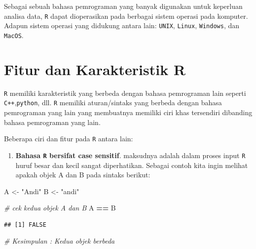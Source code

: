 \documentclass[
]{book}
\newenvironment{Shaded}{\begin{snugshade}}{\end{snugshade}}
\newcommand{\CommentTok}[1]{\textcolor[rgb]{0.56,0.35,0.01}{\textit{#1}}}
\newcommand{\NormalTok}[1]{#1}
\newcommand{\OtherTok}[1]{\textcolor[rgb]{0.56,0.35,0.01}{#1}}
\newcommand{\SpecialCharTok}[1]{\textcolor[rgb]{0.81,0.36,0.00}{\textbf{#1}}}
\newcommand{\StringTok}[1]{\textcolor[rgb]{0.31,0.60,0.02}{#1}}
\providecommand{\tightlist}{%
  \setlength{\itemsep}{0pt}\setlength{\parskip}{0pt}}
\theoremstyle{definition}
\theoremstyle{definition}
\theoremstyle{definition}
\theoremstyle{definition}
\theoremstyle{remark}
\begin{document}
Sebagai sebuah bahasa pemrograman yang banyak digunakan untuk keperluan analisa data, \texttt{R} dapat dioperasikan pada berbagai sistem operasi pada komputer. Adapun sistem operasi yang didukung antara lain: \texttt{UNIX}, \texttt{Linux}, \texttt{Windows}, dan \texttt{MacOS}.

\hypertarget{fiturR}{%
\section{Fitur dan Karakteristik R}\label{fiturR}}

\texttt{R} memiliki karakteristik yang berbeda dengan bahasa pemrograman lain seperti \texttt{C++},\texttt{python}, dll. \texttt{R} memiliki aturan/sintaks yang berbeda dengan bahasa pemrograman yang lain yang membuatnya memiliki ciri khas tersendiri dibanding bahasa pemrograman yang lain.

Beberapa ciri dan fitur pada \texttt{R} antara lain:

\begin{enumerate}
\def\labelenumi{\arabic{enumi}.}
\tightlist
\item
  \textbf{Bahasa \texttt{R} bersifat case sensitif}. maksudnya adalah dalam proses input \texttt{R} huruf besar dan kecil sangat diperhatikan. Sebagai contoh kita ingin melihat apakah objek A dan B pada sintaks berikut:
\end{enumerate}

\begin{Shaded}
\begin{Highlighting}[]
\NormalTok{A }\OtherTok{\textless{}{-}} \StringTok{"Andi"}
\NormalTok{B }\OtherTok{\textless{}{-}} \StringTok{"andi"}

\CommentTok{\# cek kedua objek A dan B}
\NormalTok{A }\SpecialCharTok{==}\NormalTok{ B}
\end{Highlighting}
\end{Shaded}

\begin{verbatim}
## [1] FALSE
\end{verbatim}

\begin{Shaded}
\begin{Highlighting}[]
\CommentTok{\# Kesimpulan : Kedua objek berbeda}
\end{Highlighting}
\end{Shaded}
\end{document}

